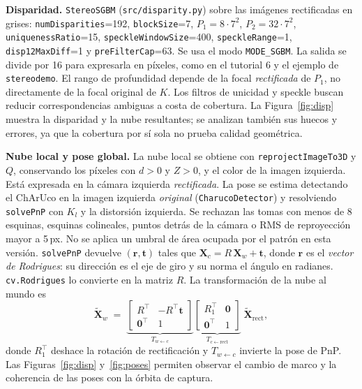 \documentclass[10pt,a4paper]{article}
\begin{document}
\textbf{Disparidad.} \texttt{StereoSGBM} (\texttt{src/disparity.py}) sobre las imágenes rectificadas
en grises: \texttt{numDisparities}=192, \texttt{blockSize}=7, $P_1=8\cdot7^2$,
$P_2=32\cdot7^2$, \texttt{uniquenessRatio}=15, \texttt{speckleWindowSize}=400,
\texttt{speckleRange}=1, \texttt{disp12MaxDiff}=1 y \texttt{preFilterCap}=63.
Se usa el modo \texttt{MODE\_SGBM}. La salida se divide por 16 para expresarla en píxeles,
como en el tutorial 6 y el ejemplo de \texttt{stereodemo}. El rango de profundidad depende
de la focal \emph{rectificada} de $P_1$, no directamente de la focal original de $K$.
Los filtros de unicidad y speckle buscan reducir correspondencias ambiguas a costa de cobertura.
La Figura~\ref{fig:disp} muestra la disparidad y la nube resultantes; se analizan también
sus huecos y errores, ya que la cobertura por sí sola no prueba calidad geométrica.

\textbf{Nube local y pose global.} La nube local se obtiene con \texttt{reprojectImageTo3D}
y $Q$, conservando los píxeles con $d>0$ y $Z>0$, y el color de la imagen izquierda. Está
expresada en la cámara izquierda \emph{rectificada}. La pose se estima detectando el ChArUco
en la imagen izquierda \emph{original} (\texttt{CharucoDetector}) y resolviendo
\texttt{solvePnP} con $K_l$ y la distorsión izquierda. Se rechazan las tomas con menos de 8
esquinas, esquinas colineales, puntos detrás de la cámara o RMS de reproyección
mayor a 5\,px. No se aplica un umbral de área ocupada por el patrón en esta versión.
\texttt{solvePnP} devuelve $(\mathbf{r},\mathbf{t})$ tales que
$\mathbf{X}_c = R\,\mathbf{X}_w+\mathbf{t}$, donde $\mathbf{r}$ es el \emph{vector de Rodrigues}: su
dirección es el eje de giro y su norma el ángulo en radianes. \texttt{cv.Rodrigues} lo
convierte en la matriz $R$. La transformación de la nube al mundo es
\[
\tilde{\mathbf{X}}_w \;=\; \underbrace{\begin{bmatrix}R^\top & -R^\top\mathbf{t}\\ \mathbf{0}^\top&1\end{bmatrix}}_{T_{w\leftarrow c}}
\underbrace{\begin{bmatrix}R_1^\top & \mathbf{0}\\ \mathbf{0}^\top&1\end{bmatrix}}_{T_{c\leftarrow \text{rect}}}\;\tilde{\mathbf{X}}_{\text{rect}},
\]
donde $R_1^\top$ deshace la rotación de rectificación y $T_{w\leftarrow c}$ invierte la pose de PnP.
Las Figuras~\ref{fig:disp} y~\ref{fig:poses} permiten observar el cambio de marco y la
coherencia de las poses con la órbita de captura.
\end{document}
